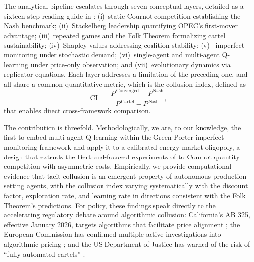 The analytical pipeline escalates through seven conceptual layers,
detailed as a sixteen-step reading guide in
: (i)~static
Cournot competition establishing the Nash benchmark; (ii)~Stackelberg
leadership quantifying OPEC's first-mover advantage; (iii)~repeated
games and the Folk Theorem formalizing cartel sustainability;
(iv)~Shapley values addressing coalition stability;
(v)~\citet{greenporter1984} imperfect monitoring under stochastic
demand; (vi)~single-agent and multi-agent Q-learning under price-only
observation; and (vii)~evolutionary dynamics via replicator equations.
Each layer addresses a limitation of the preceding one, and all share a
common quantitative metric, which is the collusion index, defined as
\begin{equation}
\mathrm{CI} \;=\; \frac{P^{\,\text{Converged}} - P^{\,\text{Nash}}}{P^{\,\text{Cartel}} - P^{\,\text{Nash}}},
\label{eq:ci-intro}
\end{equation}
that enables direct cross-framework comparison.

The contribution is threefold. Methodologically, we are, to our
knowledge, the first to embed multi-agent Q-learning within the
Green-Porter imperfect monitoring framework and apply it to a
calibrated energy-market oligopoly, a design that extends the
Bertrand-focused experiments of \citet{calvano2020} to Cournot quantity
competition with asymmetric costs. Empirically, we provide computational
evidence that tacit collusion is an emergent property of autonomous
production-setting agents, with the collusion index varying
systematically with the discount factor, exploration rate, and learning
rate in directions consistent with the Folk Theorem's predictions. For
policy, these findings speak directly to the accelerating regulatory
debate around algorithmic collusion: California's AB 325, effective
January 2026, targets algorithms that facilitate price alignment
\citep{dlapiper2025}; the European Commission has confirmed multiple
active investigations into algorithmic pricing \citep{nortonrose2025,loyensloeff2026};
and the US Department of Justice has warned of the risk of ``fully
automated cartels'' \citep{kavanagh2025}.
